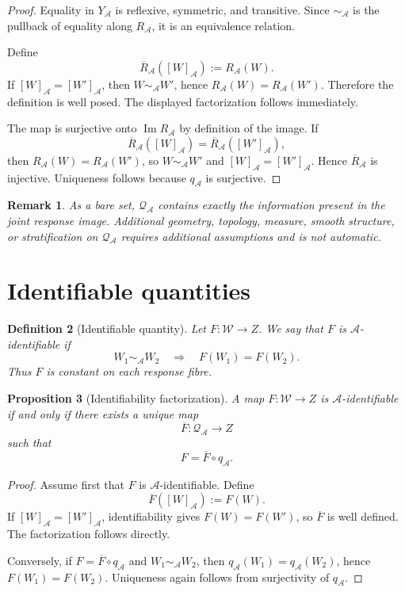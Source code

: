 \documentclass[11pt]{article}
\newtheorem{definition}{Definition}[section]
\newtheorem{proposition}[definition]{Proposition}
\newtheorem{remark}[definition]{Remark}
\newcommand{\W}{\mathcal W}
\newcommand{\Acal}{\mathcal A}
\newcommand{\QA}{\mathcal Q_{\mathcal A}}
\newcommand{\RA}{R_{\mathcal A}}
\begin{document}
\begin{proof}
Equality in $Y_{\Acal}$ is reflexive, symmetric, and transitive.  Since
$\sim_{\Acal}$ is the pullback of equality along $\RA$, it is an equivalence
relation.

Define
\[
\overline R_{\Acal}([W]_{\Acal}):=\RA(W).
\]
If $[W]_{\Acal}=[W']_{\Acal}$, then $W\sim_{\Acal}W'$, hence
$\RA(W)=\RA(W')$.  Therefore the definition is well posed.  The displayed
factorization follows immediately.

The map is surjective onto $\operatorname{Im}\RA$ by definition of the image.
If
\[
\overline R_{\Acal}([W]_{\Acal})
=
\overline R_{\Acal}([W']_{\Acal}),
\]
then $\RA(W)=\RA(W')$, so $W\sim_{\Acal}W'$ and
$[W]_{\Acal}=[W']_{\Acal}$.  Hence $\overline R_{\Acal}$ is injective.
Uniqueness follows because $q_{\Acal}$ is surjective.
\end{proof}

\begin{remark}
As a bare set, $\QA$ contains exactly the information present in the joint
response image.  Additional geometry, topology, measure, smooth structure, or
stratification on $\QA$ requires additional assumptions and is not automatic.
\end{remark}

\section{Identifiable quantities}

\begin{definition}[Identifiable quantity]
Let $F:\W\to Z$.  We say that $F$ is \emph{$\Acal$-identifiable} if
\[
W_1\sim_{\Acal}W_2
\quad\Longrightarrow\quad
F(W_1)=F(W_2).
\]
Thus $F$ is constant on each response fibre.
\end{definition}

\begin{proposition}[Identifiability factorization]
A map $F:\W\to Z$ is $\Acal$-identifiable if and only if there exists a unique
map
\[
\overline F:\QA\to Z
\]
such that
\[
F=\overline F\circ q_{\Acal}.
\]
\end{proposition}

\begin{proof}
Assume first that $F$ is $\Acal$-identifiable.  Define
\[
\overline F([W]_{\Acal}):=F(W).
\]
If $[W]_{\Acal}=[W']_{\Acal}$, identifiability gives $F(W)=F(W')$, so
$\overline F$ is well defined.  The factorization follows directly.

Conversely, if $F=\overline F\circ q_{\Acal}$ and
$W_1\sim_{\Acal}W_2$, then
$q_{\Acal}(W_1)=q_{\Acal}(W_2)$, hence $F(W_1)=F(W_2)$.
Uniqueness again follows from surjectivity of $q_{\Acal}$.
\end{proof}
\end{document}
